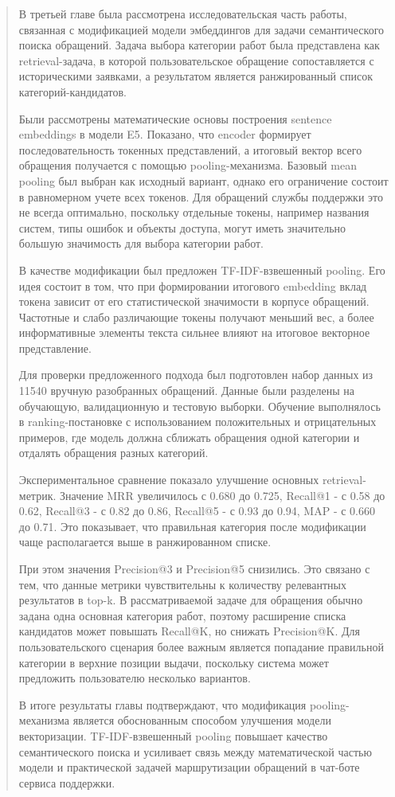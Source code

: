 \documentclass[
]{article}
\begin{document}
\begin{quote}
В третьей главе была рассмотрена исследовательская часть работы,
связанная с модификацией модели эмбеддингов для задачи семантического
поиска обращений. Задача выбора категории работ была представлена как
retrieval-задача, в которой пользовательское обращение сопоставляется с
историческими заявками, а результатом является ранжированный список
категорий-кандидатов.

Были рассмотрены математические основы построения sentence embeddings в
модели E5. Показано, что encoder формирует последовательность токенных
представлений, а итоговый вектор всего обращения получается с помощью
pooling-механизма. Базовый mean pooling был выбран как исходный вариант,
однако его ограничение состоит в равномерном учете всех токенов. Для
обращений службы поддержки это не всегда оптимально, поскольку отдельные
токены, например названия систем, типы ошибок и объекты доступа, могут
иметь значительно большую значимость для выбора категории работ.

В качестве модификации был предложен TF-IDF-взвешенный pooling. Его идея
состоит в том, что при формировании итогового embedding вклад токена
зависит от его статистической значимости в корпусе обращений. Частотные
и слабо различающие токены получают меньший вес, а более информативные
элементы текста сильнее влияют на итоговое векторное представление.

Для проверки предложенного подхода был подготовлен набор данных из 11540
вручную разобранных обращений. Данные были разделены на обучающую,
валидационную и тестовую выборки. Обучение выполнялось в
ranking-постановке с использованием положительных и отрицательных
примеров, где модель должна сближать обращения одной категории и
отдалять обращения разных категорий.

Экспериментальное сравнение показало улучшение основных
retrieval-метрик. Значение MRR увеличилось с 0.680 до 0.725, Recall@1 -
с 0.58 до 0.62, Recall@3 - с 0.82 до 0.86, Recall@5 - с 0.93 до 0.94,
MAP - с 0.660 до 0.71. Это показывает, что правильная категория после
модификации чаще располагается выше в ранжированном списке.

При этом значения Precision@3 и Precision@5 снизились. Это связано с
тем, что данные метрики чувствительны к количеству релевантных
результатов в top-k. В рассматриваемой задаче для обращения обычно
задана одна основная категория работ, поэтому расширение списка
кандидатов может повышать Recall@K, но снижать Precision@K. Для
пользовательского сценария более важным является попадание правильной
категории в верхние позиции выдачи, поскольку система может предложить
пользователю несколько вариантов.

В итоге результаты главы подтверждают, что модификация pooling-механизма
является обоснованным способом улучшения модели векторизации.
TF-IDF-взвешенный pooling повышает качество семантического поиска и
усиливает связь между математической частью модели и практической
задачей маршрутизации обращений в чат-боте сервиса поддержки.
\end{quote}
\end{document}
